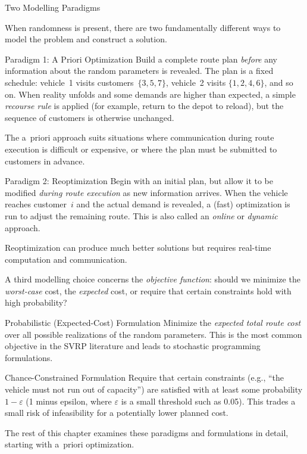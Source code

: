 \documentclass[aspectratio=169,10pt]{beamer}
\begin{document}
\begin{frame}[allowframebreaks]{Two Modelling Paradigms}

  When randomness is present, there are two fundamentally different ways to
  model the problem and construct a solution.

  \begin{block}{Paradigm 1: A Priori Optimization}
    Build a complete route plan \emph{before} any information about the random
    parameters is revealed.
    The plan is a fixed schedule: vehicle~1 visits customers~$\{3,5,7\}$,
    vehicle~2 visits $\{1,2,4,6\}$, and so on.
    When reality unfolds and some demands are higher than expected, a simple
    \emph{recourse rule} is applied (for example, return to the depot to
    reload), but the sequence of customers is otherwise unchanged.

    The a~priori approach suits situations where communication during route
    execution is difficult or expensive, or where the plan must be submitted to
    customers in advance.
  \end{block}

  \begin{block}{Paradigm 2: Reoptimization}
    Begin with an initial plan, but allow it to be modified \emph{during
    route execution} as new information arrives.
    When the vehicle reaches customer~$i$ and the actual demand is revealed,
    a (fast) optimization is run to adjust the remaining route.
    This is also called an \emph{online} or \emph{dynamic} approach.

    Reoptimization can produce much better solutions but requires
    real-time computation and communication.
  \end{block}

  \framebreak

  A third modelling choice concerns the \emph{objective function}: should
  we minimize the \emph{worst-case} cost, the \emph{expected} cost, or
  require that certain constraints hold with high probability?

  \begin{block}{Probabilistic (Expected-Cost) Formulation}
    Minimize the \emph{expected total route cost} over all possible
    realizations of the random parameters.  This is the most common
    objective in the SVRP literature and leads to stochastic programming
    formulations.
  \end{block}

  \begin{block}{Chance-Constrained Formulation}
    Require that certain constraints (e.g., ``the vehicle must not run out
    of capacity'') are satisfied with at least some probability
    $1-\varepsilon$ (1 minus epsilon, where $\varepsilon$ is a small
    threshold such as 0.05).  This trades a small risk of infeasibility for
    a potentially lower planned cost.
  \end{block}

  The rest of this chapter examines these paradigms and formulations in
  detail, starting with a~priori optimization.

\end{frame}
\end{document}
